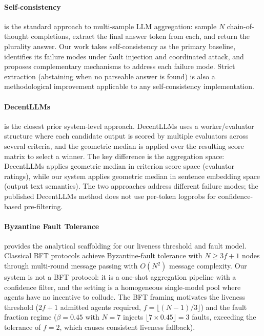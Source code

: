 \documentclass[11pt]{article}
\begin{document}
\paragraph{Self-consistency \citep{wang2023self}}
is the standard approach to multi-sample LLM aggregation: sample $N$
chain-of-thought completions, extract the final answer token from each, and
return the plurality answer. Our work takes self-consistency as the primary
baseline, identifies its failure modes under fault injection and coordinated
attack, and proposes complementary mechanisms to address each failure mode.
Strict extraction (abstaining when no parseable answer is found) is also a
methodological improvement applicable to any self-consistency implementation.

\paragraph{DecentLLMs \citep{jo2024decentllms}}
is the closest prior system-level approach. DecentLLMs uses a worker/evaluator
structure where each candidate output is scored by multiple evaluators across
several criteria, and the geometric median is applied over the resulting score
matrix to select a winner. The key difference is the aggregation space:
DecentLLMs applies geometric median in criterion score space (evaluator ratings),
while our system applies geometric median in sentence embedding space (output
text semantics). The two approaches address different failure modes; the
published DecentLLMs method does not use per-token logprobs for
confidence-based pre-filtering.

\paragraph{Byzantine Fault Tolerance \citep{lamport1982byzantine,castro1999practical}}
provides the analytical scaffolding for our liveness threshold and fault model.
Classical BFT protocols achieve Byzantine-fault tolerance with $N \geq 3f+1$
nodes through multi-round message passing with $O(N^2)$ message complexity. Our
system is not a BFT protocol: it is a one-shot aggregation pipeline with a
confidence filter, and the setting is a homogeneous single-model pool where
agents have no incentive to collude. The BFT framing motivates the liveness
threshold ($2f+1$ admitted agents required, $f = \lfloor(N-1)/3\rfloor$) and the
fault fraction regime ($\beta=0.45$ with $N=7$ injects $\lfloor7\times0.45\rfloor=3$ faults,
exceeding the tolerance of $f=2$, which causes consistent liveness fallback).
\end{document}

